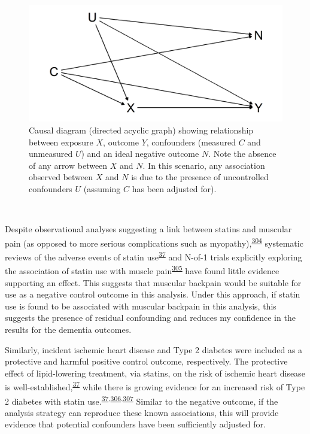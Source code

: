 \documentclass[a4paper, twoside]{templates/ociamthesis}
\begin{document}
\begin{figure}[H]

{\centering \includegraphics[width=0.8\linewidth]{figures/cprd-analysis/negativeOutcome} 

}

\caption[Causal diagram for ideal negative outcome]{Causal diagram (directed acyclic graph) showing relationship between exposure \(X\), outcome \(Y\), confounders (measured \(C\) and unmeasured \(U\)) and an ideal negative outcome \(N\). Note the absence of any arrow between \(X\) and \(N\). In this scenario, any association observed between \(X\) and \(N\) is due to the presence of uncontrolled confounders \(U\) (assuming \(C\) has been adjusted for).}\label{fig:negativeOutcome}
\end{figure}

~

Despite observational analyses suggesting a link between statins and muscular pain (as opposed to more serious complications such as myopathy),\textsuperscript{\protect\hyperlink{ref-selva-ocallaghan2018}{304}} systematic reviews of the adverse events of statin use\textsuperscript{\protect\hyperlink{ref-collins2016}{37}} and N-of-1 trials explicitly exploring the association of statin use with muscle pain\textsuperscript{\protect\hyperlink{ref-herrett2021}{305}} have found little evidence supporting an effect. This suggests that muscular backpain would be suitable for use as a negative control outcome in this analysis. Under this approach, if statin use is found to be associated with muscular backpain in this analysis, this suggests the presence of residual confounding and reduces my confidence in the results for the dementia outcomes.

Similarly, incident ischemic heart disease and Type 2 diabetes were included as a protective and harmful positive control outcome, respectively. The protective effect of lipid-lowering treatment, via statins, on the risk of ischemic heart disease is well-established,\textsuperscript{\protect\hyperlink{ref-collins2016}{37}} while there is growing evidence for an increased risk of Type 2 diabetes with statin use.\textsuperscript{\protect\hyperlink{ref-collins2016}{37},\protect\hyperlink{ref-macedo2014}{306},\protect\hyperlink{ref-smit2020}{307}} Similar to the negative outcome, if the analysis strategy can reproduce these known associations, this will provide evidence that potential confounders have been sufficiently adjusted for.
\end{document}
